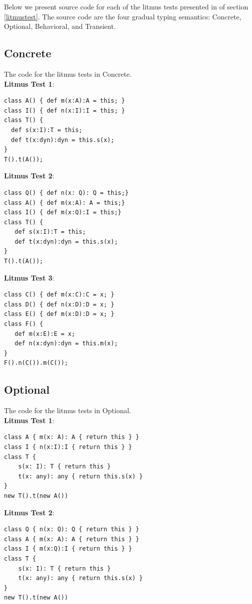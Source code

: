 \documentclass[runnningheads]{tex/llncs}
\begin{document}
Below we present source code for each of the litmus tests presented in
 of section \ref{litmustest}. The source code are
the four gradual typing semantics: Concrete, Optional, Behavioral, and Transient.

\subsection*{Concrete}

The code for the litmus tests in Concrete. \\ 

\noindent
\textbf{Litmus Test 1}:
\begin{verbatim}
class A() { def m(x:A):A = this; }
class I() { def n(x:I):I = this; }
class T() {
  def s(x:I):T = this;
  def t(x:dyn):dyn = this.s(x);
}
T().t(A());
\end{verbatim}

\noindent
\textbf{Litmus Test 2}:
\begin{verbatim}
class Q() { def n(x: Q): Q = this;}
class A() { def m(x:A): A = this;}
class I() { def m(x:Q):I = this;}
class T() {
   def s(x:I):T = this; 
   def t(x:dyn):dyn = this.s(x);
}
T().t(A());   
\end{verbatim}


\noindent\textbf{Litmus Test 3}:
\begin{verbatim}
class C() { def m(x:C):C = x; }
class D() { def n(x:D):D = x; }
class E() { def m(x:D):D = x; }      
class F() {
   def m(x:E):E = x;
   def n(x:dyn):dyn = this.m(x);
} 
F().n(C()).m(C());
\end{verbatim}

\subsection*{Optional}

The code for the litmus tests in Optional. \\

\noindent\textbf{Litmus Test 1}:
\begin{verbatim}
class A { m(x: A): A { return this } }
class I { n(x:I):I { return this } }
class T {
    s(x: I): T { return this }
    t(x: any): any { return this.s(x) }
}
new T().t(new A())
\end{verbatim}

\noindent\textbf{Litmus Test 2}:
\begin{verbatim}
class Q { n(x: Q): Q { return this } }
class A { m(x: A): A { return this } }
class I { m(x:Q):I { return this } }
class T {
    s(x: I): T { return this }
    t(x: any): any { return this.s(x) }
}
new T().t(new A())
\end{verbatim}
\end{document}
